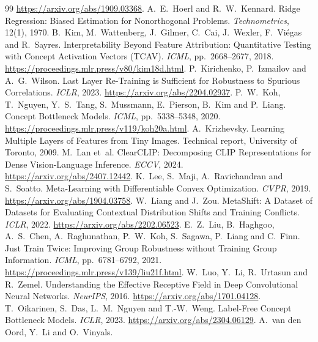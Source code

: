 \documentclass{article}
\begin{document}
\begin{thebibliography}{99}
\url{https://arxiv.org/abs/1909.03368}.
A.~E.~Hoerl and R.~W.~Kennard.
Ridge Regression: Biased Estimation for Nonorthogonal Problems. \emph{Technometrics}, 12(1), 1970.
B.~Kim, M.~Wattenberg, J.~Gilmer, C.~Cai, J.~Wexler, F.~Vi\'egas and R.~Sayres.
Interpretability Beyond Feature Attribution: Quantitative Testing with Concept Activation Vectors (TCAV).
\emph{ICML}, pp.~2668--2677, 2018. \url{https://proceedings.mlr.press/v80/kim18d.html}.
P.~Kirichenko, P.~Izmailov and A.~G.~Wilson.
Last Layer Re-Training is Sufficient for Robustness to Spurious Correlations.
\emph{ICLR}, 2023. \url{https://arxiv.org/abs/2204.02937}.
P.~W.~Koh, T.~Nguyen, Y.~S.~Tang, S.~Mussmann, E.~Pierson, B.~Kim and P.~Liang.
Concept Bottleneck Models. \emph{ICML}, pp.~5338--5348, 2020.
\url{https://proceedings.mlr.press/v119/koh20a.html}.
A.~Krizhevsky.
Learning Multiple Layers of Features from Tiny Images. Technical report, University of Toronto, 2009.
M.~Lan et~al.
ClearCLIP: Decomposing CLIP Representations for Dense Vision-Language Inference.
\emph{ECCV}, 2024. \url{https://arxiv.org/abs/2407.12442}.
K.~Lee, S.~Maji, A.~Ravichandran and S.~Soatto.
Meta-Learning with Differentiable Convex Optimization. \emph{CVPR}, 2019.
\url{https://arxiv.org/abs/1904.03758}.
W.~Liang and J.~Zou.
MetaShift: A Dataset of Datasets for Evaluating Contextual Distribution Shifts and Training Conflicts.
\emph{ICLR}, 2022. \url{https://arxiv.org/abs/2202.06523}.
E.~Z.~Liu, B.~Haghgoo, A.~S.~Chen, A.~Raghunathan, P.~W.~Koh,
S.~Sagawa, P.~Liang and C.~Finn.
Just Train Twice: Improving Group Robustness without Training Group Information.
\emph{ICML}, pp.~6781--6792, 2021.
\url{https://proceedings.mlr.press/v139/liu21f.html}.
W.~Luo, Y.~Li, R.~Urtasun and R.~Zemel.
Understanding the Effective Receptive Field in Deep Convolutional Neural Networks. \emph{NeurIPS}, 2016.
\url{https://arxiv.org/abs/1701.04128}.
T.~Oikarinen, S.~Das, L.~M.~Nguyen and T.-W.~Weng.
Label-Free Concept Bottleneck Models. \emph{ICLR}, 2023.
\url{https://arxiv.org/abs/2304.06129}.
A.~van den Oord, Y.~Li and O.~Vinyals.

\end{thebibliography}
\end{document}

